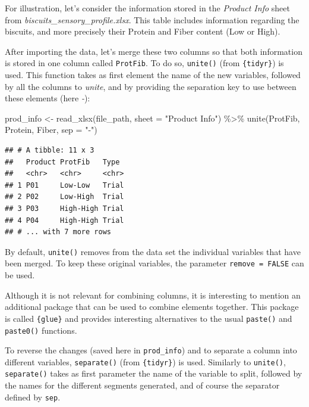 \documentclass[
]{krantz}
\makeatletter
\newenvironment{Shaded}{\begin{snugshade}}{\end{snugshade}}
\newcommand{\AttributeTok}[1]{\textcolor[rgb]{0.61,0.61,0.61}{#1}}
\newcommand{\FunctionTok}[1]{\textcolor[rgb]{0,0,0}{#1}}
\newcommand{\NormalTok}[1]{#1}
\newcommand{\OtherTok}[1]{\textcolor[rgb]{0.37,0.37,0.37}{#1}}
\newcommand{\SpecialCharTok}[1]{\textcolor[rgb]{0,0,0}{#1}}
\newcommand{\StringTok}[1]{\textcolor[rgb]{0.5,0.5,0.5}{#1}}
\renewenvironment{quote}{\begin{VF}}{\end{VF}}
\newenvironment{kframe}{%
\medskip{}
\setlength{\fboxsep}{.8em}
 \def\at@end@of@kframe{}%
 \ifinner\ifhmode%
  \def\at@end@of@kframe{\end{minipage}}%
  \begin{minipage}{\columnwidth}%
 \fi\fi%
 \def\FrameCommand##1{\hskip\@totalleftmargin \hskip-\fboxsep
 \colorbox{shadecolor}{##1}\hskip-\fboxsep
     \hskip-\linewidth \hskip-\@totalleftmargin \hskip\columnwidth}%
 \MakeFramed {\advance\hsize-\width
   \@totalleftmargin\z@ \linewidth\hsize
   \@setminipage}}%
 {\par\unskip\endMakeFramed%
 \at@end@of@kframe}
\renewenvironment{Shaded}{\begin{kframe}}{\end{kframe}}
\makeatother
\begin{document}
For illustration, let's consider the information stored in the \emph{Product Info} sheet from \emph{biscuits\_sensory\_profile.xlsx}. This table includes information regarding the biscuits, and more precisely their Protein and Fiber content (Low or High).

After importing the data, let's merge these two columns so that both information is stored in one column called \texttt{ProtFib}.
To do so, \texttt{unite()} (from \texttt{\{tidyr\}}) is used. This function takes as first element the name of the new variables, followed by all the columns to \emph{unite}, and by providing the separation key to use between these elements (here \emph{-}):

\begin{Shaded}
\begin{Highlighting}[]
\NormalTok{prod\_info }\OtherTok{\textless{}{-}} \FunctionTok{read\_xlsx}\NormalTok{(file\_path, }\AttributeTok{sheet =} \StringTok{"Product Info"}\NormalTok{) }\SpecialCharTok{\%\textgreater{}\%}
  \FunctionTok{unite}\NormalTok{(ProtFib, Protein, Fiber, }\AttributeTok{sep =} \StringTok{"{-}"}\NormalTok{)}
\end{Highlighting}
\end{Shaded}

\begin{verbatim}
## # A tibble: 11 x 3
##   Product ProtFib   Type 
##   <chr>   <chr>     <chr>
## 1 P01     Low-Low   Trial
## 2 P02     Low-High  Trial
## 3 P03     High-High Trial
## 4 P04     High-High Trial
## # ... with 7 more rows
\end{verbatim}

By default, \texttt{unite()} removes from the data set the individual variables that have been merged. To keep these original variables, the parameter \texttt{remove\ =\ FALSE} can be used.

\begin{quote}
Although it is not relevant for combining columns, it is interesting to mention an additional package that can be used to combine elements together. This package is called \texttt{\{glue\}} and provides interesting alternatives to the usual \texttt{paste()} and \texttt{paste0()} functions.
\end{quote}

To reverse the changes (saved here in \texttt{prod\_info}) and to separate a column into different variables, \texttt{separate()} (from \texttt{\{tidyr\}}) is used. Similarly to \texttt{unite()}, \texttt{separate()} takes as first parameter the name of the variable to split, followed by the names for the different segments generated, and of course the separator defined by \texttt{sep}.
\end{document}

